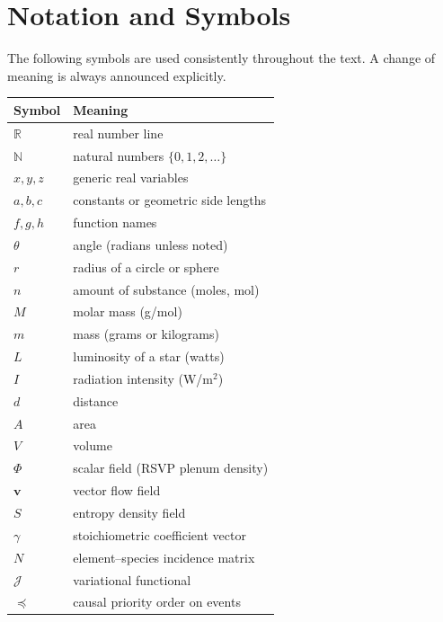\documentclass[11pt, openany]{book}
\theoremstyle{plain}
\theoremstyle{definition}
\theoremstyle{remark}
\newcommand{\R}{\mathbb{R}}
\newcommand{\N}{\mathbb{N}}
\begin{document}
\chapter*{Notation and Symbols}

The following symbols are used consistently throughout the text.
A change of meaning is always announced explicitly.

\begin{center}
\renewcommand{\arraystretch}{1.55}
\begin{tabular}{>{\bfseries}p{2.2cm} p{10cm}}
\toprule
Symbol & Meaning \\
\midrule
$\R$         & real number line \\
$\N$         & natural numbers $\{0,1,2,\dots\}$ \\
$x,y,z$      & generic real variables \\
$a,b,c$      & constants or geometric side lengths \\
$f,g,h$      & function names \\
$\theta$     & angle (radians unless noted) \\
$r$          & radius of a circle or sphere \\
$n$          & amount of substance (moles, mol) \\
$M$          & molar mass (g/mol) \\
$m$          & mass (grams or kilograms) \\
$L$          & luminosity of a star (watts) \\
$I$          & radiation intensity (W/m$^2$) \\
$d$          & distance \\
$A$          & area \\
$V$          & volume \\
$\Phi$       & scalar field (RSVP plenum density) \\
$\mathbf{v}$ & vector flow field \\
$S$          & entropy density field \\
$\gamma$     & stoichiometric coefficient vector \\
$N$          & element--species incidence matrix \\
$\mathcal{J}$ & variational functional \\
$\preceq$    & causal priority order on events \\
\bottomrule
\end{tabular}
\end{center}
\end{document}
